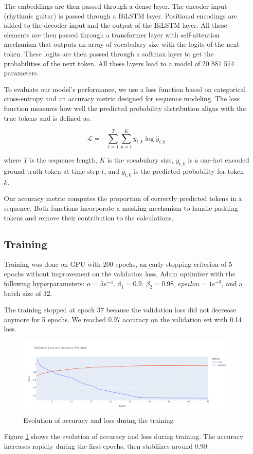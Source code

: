 The embeddings are then passed through a dense layer. The encoder input (rhythmic guitar) is passed through a BiLSTM layer.
Positional encodings are added to the decoder input and the output of the BiLSTM layer.
All these elements are then passed through a transformer layer with self-attention mechanism
that outputs an array of vocabulary size with the logits of the next token.
These logits are then passed through a softmax layer to get the probabilities of the next token.
All these layers lead to a model of 20 881 514 parameters.


To evaluate our model's performance, we use a loss function based on categorical cross-entropy and an accuracy metric designed for sequence modeling.
The loss function measures how well the predicted probability distribution aligns with the true tokens and is defined as:  

\[
\mathcal{L} = - \sum_{t=1}^{T} \sum_{k=1}^{K} y_{t,k} \log \hat{y}_{t,k}
\]

where \( T \) is the sequence length, \( K \) is the vocabulary size, \( y_{t,k} \) is a one-hot encoded ground-truth token at time step \( t \), and \( \hat{y}_{t,k} \) is the predicted probability for token \( k \).  

Our accuracy metric computes the proportion of correctly predicted tokens in a sequence.
Both functions incorporate a masking mechanism to handle padding tokens and remove their contribution to the calculations.


\subsection{Training}

Training was done on GPU with 200 epochs, an early-stopping criterion of 5 epochs without improvement on the validation loss,
Adam optimizer with the following hyperparameters: $\alpha=5e^{-4}$, $\beta_1=0.9$, $\beta_2=0.98$, $epsilon=1e^{-9}$, and a batch size of 32.

The training stopped at epoch 37 because the validation loss did not decrease anymore for 5 epochs.
We reached 0.97 accuracy on the validation set with 0.14 loss.

\begin{figure}[!ht]
    \centering
    \includegraphics[width=.8\linewidth]{../images-figures/validation_acc_loss.png}
    \caption{Evolution of accuracy and loss during the training}
    \label{fig:validation_acc_loss}
\end{figure}

Figure \ref{fig:validation_acc_loss} shows the evolution of accuracy and loss during training.
The accuracy increases rapidly during the first epochs, then stabilizes around 0.90.